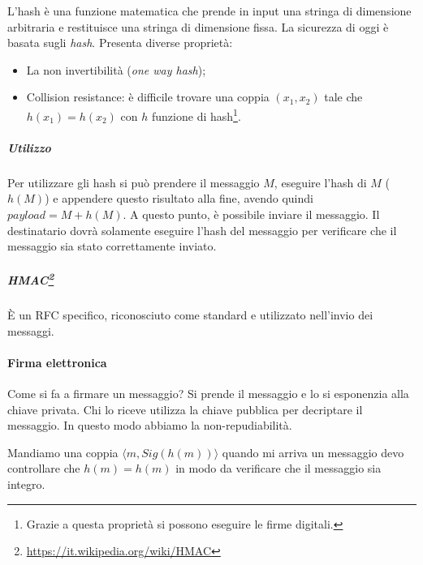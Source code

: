 L'hash è una funzione matematica che prende in input una stringa di dimensione
arbitraria e restituisce una stringa di dimensione fissa. La sicurezza di oggi è
basata sugli \textit{hash}. Presenta diverse proprietà:
\begin{itemize}
\item La non invertibilità (\emph{one way hash});
\item Collision resistance: è difficile trovare una coppia $(x_1,x_2)$ tale che
$h(x_1) = h(x_2)$ con $h$ funzione di hash\footnote{Grazie a questa proprietà si
possono eseguire le firme digitali.}.
\end{itemize}

\subparagraph*{Utilizzo}

Per utilizzare gli hash si può prendere il messaggio $M$, eseguire l'hash di $M$
($h(M)$) e appendere questo risultato alla fine, avendo quindi $payload = M +
h(M)$. A questo punto, è possibile inviare il messaggio. Il destinatario dovrà
solamente eseguire l'hash del messaggio per verificare che il messaggio sia
stato correttamente inviato.

\subparagraph*{HMAC\footnote{\url{https://it.wikipedia.org/wiki/HMAC}}}

È un RFC specifico, riconosciuto come standard e utilizzato nell'invio dei
messaggi.


\paragraph{Firma elettronica}

Come si fa a firmare un messaggio? Si prende il messaggio e lo si esponenzia
alla chiave privata. Chi lo riceve utilizza la chiave pubblica per decriptare il
messaggio. In questo modo abbiamo la non-repudiabilità.

Mandiamo una coppia $ \langle m, Sig(h(m)) \rangle $ quando mi arriva un
messaggio devo controllare che
$h(m) = h(m)$ in modo da verificare che il messaggio sia integro.
